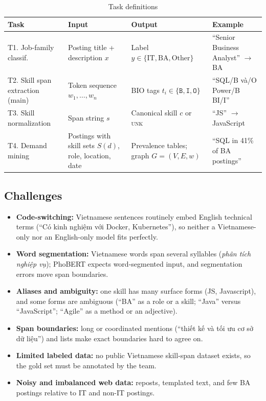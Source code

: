 \documentclass[12pt,a4paper]{article}
\begin{document}
\begin{table}[H]
\centering\small
\caption{Task definitions}
\label{tab:tasks}
\begin{tabularx}{\textwidth}{@{}P{2.6cm}P{3.4cm}P{3.4cm}L@{}}
\toprule
\textbf{Task} & \textbf{Input} & \textbf{Output} & \textbf{Example} \\
\midrule
T1. Job-family classif. & Posting title + description $x$ &
  Label $y \in \{\text{IT}, \text{BA}, \text{Other}\}$ &
  ``Senior Business Analyst'' $\rightarrow$ BA \\
\addlinespace
T2. Skill span extraction (main) & Token sequence
  $w_1,\!\dots,\!w_n$ &
  BIO tags $t_i \!\in\! \{\texttt{B},\texttt{I},\texttt{O}\}$ &
  ``SQL/B và/O Power/B BI/I'' \\
\addlinespace
T3. Skill normalization & Span string $s$ &
  Canonical skill $c$ or \textsc{unk} &
  ``JS'' $\rightarrow$ JavaScript \\
\addlinespace
T4. Demand mining & Postings with skill sets $S(d)$, role,
  location, date &
  Prevalence tables; graph $G\!=\!(V,E,w)$ &
  ``SQL in 41\% of BA postings'' \\
\bottomrule
\end{tabularx}
\end{table}

\subsection{Challenges}
\begin{itemize}
  \item \textbf{Code-switching:} Vietnamese sentences routinely embed English
        technical terms (``Có kinh nghiệm với Docker, Kubernetes''), so
        neither a Vietnamese-only nor an English-only model fits perfectly.
  \item \textbf{Word segmentation:} Vietnamese words span several
        syllables (\emph{phân tích nghiệp vụ}); PhoBERT expects
        word-segmented input, and segmentation errors move span boundaries.
  \item \textbf{Aliases and ambiguity:} one skill has many surface forms
        (JS, Javascript), and some forms are ambiguous (``BA'' as a role or
        a skill; ``Java'' versus ``JavaScript''; ``Agile'' as a method or an
        adjective).
  \item \textbf{Span boundaries:} long or coordinated mentions (``thiết
        kế và tối ưu cơ sở dữ liệu'') and lists make exact boundaries hard
        to agree on.
  \item \textbf{Limited labeled data:} no public Vietnamese skill-span
        dataset exists, so the gold set must be annotated by the team.
  \item \textbf{Noisy and imbalanced web data:} reposts, templated text, and
        few BA postings relative to IT and non-IT postings.
\end{itemize}
\end{document}
